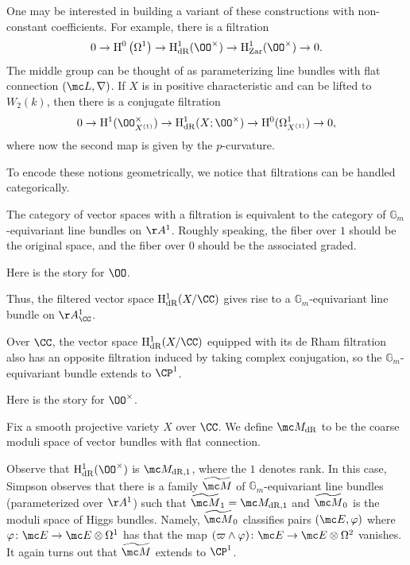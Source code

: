 \documentclass[../notes.tex]{subfiles}
\begin{document}
One may be interested in building a variant of these constructions with non-constant coefficients. For example, there is a filtration
\[0\to\mathrm H^0\left(\Omega^1\right)\to\mathrm H^1_{\mathrm{dR}}(\OO^\times)\to\mathrm H^1_{\mathrm{Zar}}(\OO^\times)\to0.\]
The middle group can be thought of as parameterizing line bundles with flat connection $(\mc L,\nabla)$. If $X$ is in positive characteristic and can be lifted to $W_2(k)$, then there is a conjugate filtration
\[0\to\mathrm H^1(\OO^\times_{X^{(1)}})\to\mathrm H^1_{\mathrm{dR}}(X;\OO^\times)\to\mathrm H^0(\Omega^1_{X^{(1)}})\to0,\]
where now the second map is given by the $p$-curvature.

To encode these notions geometrically, we notice that filtrations can be handled categorically.
\begin{remark}
	The category of vector spaces with a filtration is equivalent to the category of $\mathbb G_m$-equivariant line bundles on $\AA^1$. Roughly speaking, the fiber over $1$ should be the original space, and the fiber over $0$ should be the associated graded.
\end{remark}
Here is the story for $\OO$.
\begin{example}
	Thus, the filtered vector space $\mathrm H^1_{\mathrm{dR}}(X/\CC)$ gives rise to a $\mathbb G_m$-equivariant line bundle on $\AA^1_\CC$.
\end{example}
\begin{remark}
	Over $\CC$, the vector space $\mathrm H^1_{\mathrm{dR}}(X/\CC)$ equipped with its de Rham filtration also has an opposite filtration induced by taking complex conjugation, so the $\mathbb G_m$-equivariant bundle extends to $\CP^1$.
\end{remark}
Here is the story for $\OO^\times$.
\begin{notation}
	Fix a smooth projective variety $X$ over $\CC$. We define $\mc M_{\mathrm{dR}}$ to be the coarse moduli space of vector bundles with flat connection.
\end{notation}
\begin{example}
	Observe that $\mathrm H^1_{\mathrm{dR}}(\OO^\times)$ is $\mc M_{\mathrm{dR},1}$, where the $1$ denotes rank. In this case, Simpson observes that there is a family $\widetilde{\mc M}$ of $\mathbb G_m$-equivariant line bundles (parameterized over $\AA^1$) such that $\widetilde{\mc M}_1=\mc M_{\mathrm{dR},1}$ and $\widetilde{\mc M}_0$ is the moduli space of Higgs bundles. Namely, $\widetilde{\mc M}_0$ classifies pairs $(\mc E,\varphi)$ where $\varphi\colon\mc E\to\mc E\otimes\Omega^1$ has that the map $(\varpi\land\varphi)\colon\mc E\to\mc E\otimes\Omega^2$ vanishes. It again turns out that $\widetilde{\mc M}$ extends to $\CP^1$.
\end{example}
\end{document}
